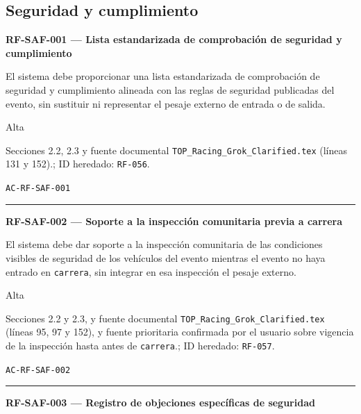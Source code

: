 \documentclass[10pt,letterpaper]{article}
\begin{document}
\subsection{Seguridad y cumplimiento}
\noindent\textbf{RF-SAF-001 --- Lista estandarizada de comprobación de seguridad y cumplimiento}\par
\begin{description}[style=nextline,leftmargin=3.15cm,labelwidth=2.8cm,font=\normalfont\bfseries]
\item[Obligación] El sistema debe proporcionar una lista estandarizada de comprobación de seguridad y cumplimiento alineada con las reglas de seguridad publicadas del evento, sin sustituir ni representar el pesaje externo de entrada o de salida.
\item[Prioridad] Alta
\item[Procedencia] Secciones 2.2, 2.3 y fuente documental \texttt{TOP\_Racing\_Grok\_Clarified.tex} (líneas 131 y 152).; ID heredado: \texttt{RF-056}.
\item[Verificación] \texttt{AC-RF-SAF-001}
\end{description}
\vspace{0.25em}\hrule\vspace{0.65em}
\noindent\textbf{RF-SAF-002 --- Soporte a la inspección comunitaria previa a carrera}\par
\begin{description}[style=nextline,leftmargin=3.15cm,labelwidth=2.8cm,font=\normalfont\bfseries]
\item[Obligación] El sistema debe dar soporte a la inspección comunitaria de las condiciones visibles de seguridad de los vehículos del evento mientras el evento no haya entrado en \texttt{carrera}, sin integrar en esa inspección el pesaje externo.
\item[Prioridad] Alta
\item[Procedencia] Secciones 2.2 y 2.3, y fuente documental \texttt{TOP\_Racing\_Grok\_Clarified.tex} (líneas 95, 97 y 152), y fuente prioritaria confirmada por el usuario sobre vigencia de la inspección hasta antes de \texttt{carrera}.; ID heredado: \texttt{RF-057}.
\item[Verificación] \texttt{AC-RF-SAF-002}
\end{description}
\vspace{0.25em}\hrule\vspace{0.65em}
\noindent\textbf{RF-SAF-003 --- Registro de objeciones específicas de seguridad}\par
\end{document}
